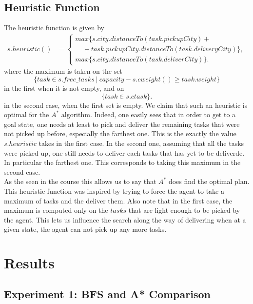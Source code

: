 \documentclass[11pt]{article}
\begin{document}
\subsection{Heuristic Function}
The heuristic function is given by 
	\begin{align*}
		s.heuristic() & = \begin{cases}	
							max \{s.city.distanceTo(task.pickupCity)+\\ \ \ \ \ \ +task.pickupCity.distanceTo(task.deliveryCity)\},\\
							max  \{s.city.distanceTo(task.deliverCity)\}.
						\end{cases}
	\end{align*}
where the maximum is taken on the set $$\{task\in s.free\_tasks\ |\ capacity-s.cweight()\geq task.weight\}$$ in the first when it is not empty, and on $$\{task\in s.ctask\}.$$ in the second case, when the first set is empty. We claim that such an heuristic is optimal for the $A^*$ algorithm. Indeed, one easily sees that in order to get to a goal state, one needs at least to pick and deliver the remaining tasks that were not picked up before, especially the farthest one. This is the exactly the value $s.heuristic$ takes in the first case. In the second one, assuming that all the tasks were picked up, one still needs to deliver each tasks that has yet to be deliverde. In particular the farthest one. This corresponds to taking this maximum in the second case. \\
As the seen in the course this allows us to say that $A^*$ does find the optimal plan. This heuristic function was inspired by trying to force the agent to take a maximum of tasks and the deliver them. Also note that in the first case, the maximum is computed only on the $tasks$ that are light enough to be picked by the agent. This lets us influence the search along the way of delivering when at a given state, the agent can not pick up any more tasks.

\section{Results}

\subsection{Experiment 1: BFS and A* Comparison}
\end{document}
